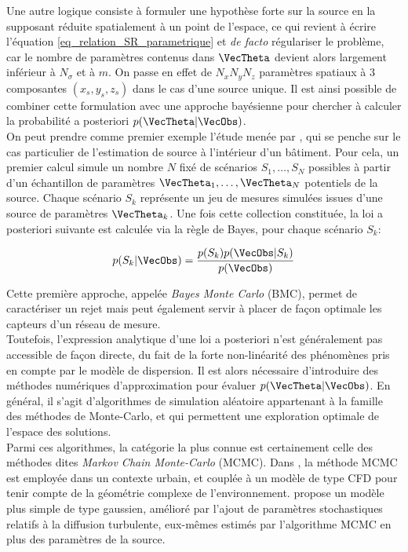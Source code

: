  Une autre logique consiste à formuler une hypothèse forte sur la source en la supposant réduite spatialement à un point de l'espace, ce qui revient à écrire l'équation \eqref{eq_relation_SR_parametrique} et \textit{de facto} régulariser le problème, car le nombre de paramètres contenus dans $\VecTheta$ devient alors largement inférieur à $N_\sigma$ et à $m$. On passe en effet de $N_xN_yN_z$ paramètres spatiaux à 3 composantes $(x_s, y_s, z_s)$ dans le cas d'une source unique. Il est ainsi possible de combiner cette formulation avec une approche bayésienne pour chercher à calculer la probabilité a posteriori $p(\VecTheta | \VecObs)$. \\
 
 On peut prendre comme premier exemple l'étude menée par \cite{Sohn2002}, qui se penche sur le cas particulier de l'estimation de source à l'intérieur d'un bâtiment. Pour cela, un premier calcul simule un nombre $N$ fixé de scénarios $S_1,\dots,S_N$ possibles à partir d'un échantillon de paramètres $\VecTheta_1, \dots, \VecTheta_N$ potentiels de la source. Chaque scénario $S_k$ représente un jeu de mesures simulées issues d'une source de paramètres $\VecTheta_k$. Une fois cette collection constituée, la loi a posteriori suivante est calculée via la règle de Bayes, pour chaque scénario $S_k$:
 
 \begin{equation}
	 \label{eq_bayes_monte_carlo}
	 p(S_k|\VecObs) = \dfrac{p(S_k)p(\VecObs | S_k)}{p(\VecObs)}
 \end{equation}
 
 Cette première approche, appelée \textit{Bayes Monte Carlo} (BMC), permet de caractériser un rejet mais peut également servir à placer de façon optimale les capteurs d'un réseau de mesure. \\
 
 Toutefois, l'expression analytique d'une loi a posteriori n'est généralement  pas accessible de façon directe, du fait de la forte non-linéarité des phénomènes pris en compte par le modèle de dispersion. Il est alors nécessaire d'introduire des méthodes numériques d'approximation pour évaluer  $p(\VecTheta | \VecObs)$. En général, il s'agit d'algorithmes de simulation aléatoire appartenant à la famille des méthodes de Monte-Carlo, et qui permettent une exploration optimale de l'espace des solutions.\\
 
 Parmi ces algorithmes, la catégorie la plus connue est certainement celle des méthodes dites \textit{Markov Chain Monte-Carlo} (MCMC). Dans \cite{Chow2008}, la méthode MCMC est employée dans un contexte urbain, et couplée à un modèle de type CFD pour tenir compte de la géométrie complexe de l'environnement. \cite{Senocak2008} propose un modèle plus simple de type gaussien, amélioré par l'ajout de paramètres stochastiques relatifs à la diffusion turbulente, eux-mêmes estimés par l'algorithme MCMC en plus des paramètres de la source. \\
 
